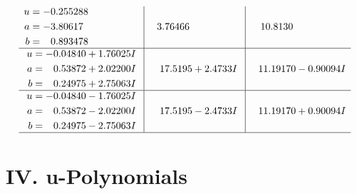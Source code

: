 \documentclass[1p]{elsarticle_modified}
\theoremstyle{definition}
\begin{document}
$$\begin{array}{c|c|c}
\begin{aligned}
u &= -0.255288\phantom{ +0.000000I} \\
a &= -3.80617\phantom{ +0.000000I} \\
b &= \phantom{-}0.893478\phantom{ +0.000000I}\end{aligned}
 & \phantom{-}3.76466\phantom{ +0.000000I} & \phantom{-}10.8130\phantom{ +0.000000I} \\ \hline\begin{aligned}
u &= -0.04840 + 1.76025 I \\
a &= \phantom{-}0.53872 + 2.02200 I \\
b &= \phantom{-}0.24975 + 2.75063 I\end{aligned}
 & \phantom{-}17.5195 + 2.4733 I & \phantom{-}11.19170 - 0.90094 I \\ \hline\begin{aligned}
u &= -0.04840 - 1.76025 I \\
a &= \phantom{-}0.53872 - 2.02200 I \\
b &= \phantom{-}0.24975 - 2.75063 I\end{aligned}
 & \phantom{-}17.5195 - 2.4733 I & \phantom{-}11.19170 + 0.90094 I\\
 \hline 
 \end{array}$$\newpage
\newpage\renewcommand{\arraystretch}{1}
\centering \section*{ IV. u-Polynomials}
\end{document}

